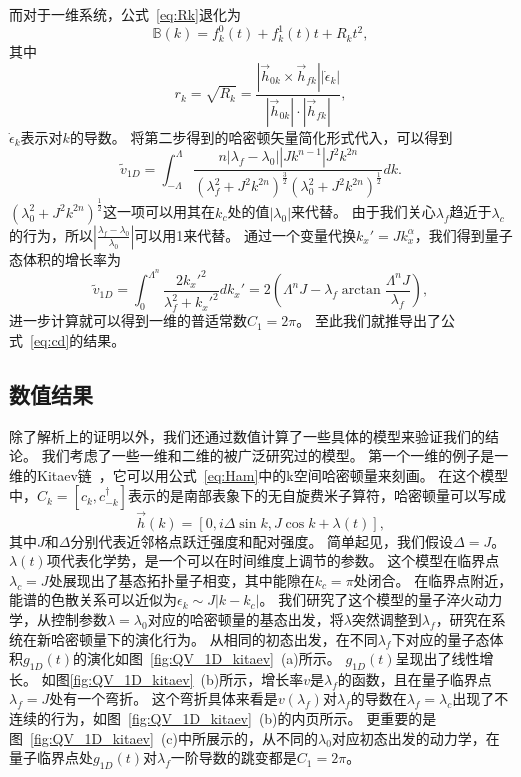 			而对于一维系统，公式~\eqref{eq:Rk}退化为
			\begin{equation}
				\mathbb{B}(k) = f_k^0(t)+f_k^1(t) t+R_k t^2,
			\end{equation}
			其中
			\begin{equation} \label{Eq:rk_1D}
				r_k = \sqrt{R_k} = \frac{|{\vec{h}}_{0k}\times \vec{h}_{fk}||\dot{\epsilon}_k|}{|{\vec{h}}_{0k}|\cdot|\vec{h}_{fk}|},
			\end{equation}
			$\dot{\epsilon}_k$表示对$k$的导数。
			将第二步得到的哈密顿矢量简化形式代入，可以得到
			\begin{equation}
				\tilde{v}_{1D} = \int_{-\Lambda}^{\Lambda}{\frac{n |\lambda_f-\lambda_0||J k^{n-1}|J^2 k^{2n}}{(\lambda_f^2+J^2 k^{2n})^{\frac32}(\lambda_0^2+J^2 k^{2n})^{\frac12}} dk}.
			\end{equation}
			$(\lambda_0^2+J^2 k^{2n})^{\frac12}$这一项可以用其在$k_c$处的值$|\lambda_0|$来代替。
			由于我们关心$\lambda_f$趋近于$\lambda_c$的行为，所以$|\frac{\lambda_f-\lambda_0}{\lambda_0}|$可以用1来代替。
			通过一个变量代换$k_x'=J k_x^\alpha$，我们得到量子态体积的增长率为
			\begin{equation}
				\tilde{v}_{1D} = \int_{0}^{\Lambda^n}{\frac{2k_x'^2}{\lambda_f^2+k_x'^2}}dk_x'
				= 2\left(\Lambda^nJ-\lambda_f\arctan{\frac{\Lambda^nJ}{\lambda_f}}\right),
			\end{equation}
			进一步计算就可以得到一维的普适常数$C_1=2\pi$。
			至此我们就推导出了公式~\eqref{eq:cd}的结果。
			
		\subsection{数值结果}
			除了解析上的证明以外，我们还通过数值计算了一些具体的模型来验证我们的结论。
			我们考虑了一些一维和二维的被广泛研究过的模型。
			第一个一维的例子是一维的Kitaev链~\cite{Kitaev2001}，它可以用公式~\eqref{eq:Ham}中的k空间哈密顿量来刻画。
			在这个模型中，$C_k = [c_k, c_{-k}^\dag]$表示的是南部表象下的无自旋费米子算符，哈密顿量可以写成~\cite{Kitaev2001}
			\begin{equation}
				\vec{h}(k) = [0, i\Delta\sin k, J\cos k + \lambda(t)],
			\end{equation}
			其中$J$和$\Delta$分别代表近邻格点跃迁强度和配对强度。
			简单起见，我们假设$\Delta = J$。
			$\lambda(t)$项代表化学势，是一个可以在时间维度上调节的参数。
			这个模型在临界点$\lambda_c = J$处展现出了基态拓扑量子相变，其中能隙在$k_c = \pi$处闭合。
			在临界点附近，能谱的色散关系可以近似为$\epsilon_k \sim J|k - k_c|$。
			我们研究了这个模型的量子淬火动力学，从控制参数$\lambda=\lambda_0$对应的哈密顿量的基态出发，将$\lambda$突然调整到$\lambda_f$，研究在系统在新哈密顿量下的演化行为。
			从相同的初态出发，在不同$\lambda_f$下对应的量子态体积$g_{1D}(t)$的演化如图~\ref{fig:QV_1D_kitaev}~(a)所示。
			$g_{1D}(t)$呈现出了线性增长。
			如图\ref{fig:QV_1D_kitaev}~(b)所示，增长率$v$是$\lambda_f$的函数，且在量子临界点$\lambda_f=J$处有一个弯折。
			这个弯折具体来看是$v(\lambda_f)$对$\lambda_f$的导数在$\lambda_f=\lambda_c$出现了不连续的行为，如图~\ref{fig:QV_1D_kitaev}~(b)的内页所示。
			更重要的是图~\ref{fig:QV_1D_kitaev}~(c)中所展示的，从不同的$\lambda_0$对应初态出发的动力学，在量子临界点处$g_{1D}(t)$对$\lambda_f$一阶导数的跳变都是$C_1=2\pi$。
			
